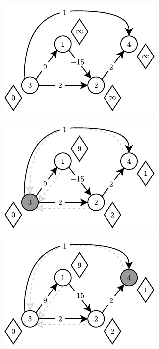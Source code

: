 \begin{figure}[!htbp]
	\centering
	\begin{subfigure}[b]{0.3\textwidth}
		\includegraphics[width=\textwidth]{Chapter_II/DIJKSTRA-NegativeArc/a.pdf}
		\caption{}
	\end{subfigure}%
	\begin{subfigure}[b]{0.3\textwidth}
		\includegraphics[width=\textwidth]{Chapter_II/DIJKSTRA-NegativeArc/b.pdf}
		\caption{}
	\end{subfigure}
	\begin{subfigure}[b]{0.3\textwidth}
		\includegraphics[width=\textwidth]{Chapter_II/DIJKSTRA-NegativeArc/c.pdf}

\end{subfigure}
\end{figure}
